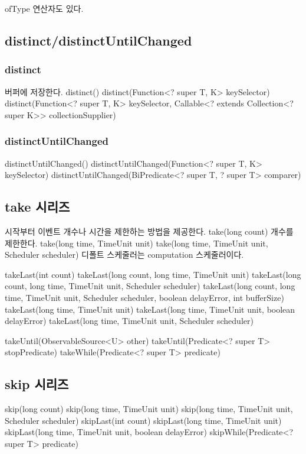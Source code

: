 \documentclass{book}
\begin{document}
{ofType 연산자도 있다.

\subsection{distinct/distinctUntilChanged}
\subsubsection{distinct}
버퍼에 저장한다.
distinct()
distinct(Function<? super T, K> keySelector)
distinct(Function<? super T, K> keySelector, Callable<? extends Collection<? super K>> collectionSupplier)

\subsubsection{distinctUntilChanged}
distinctUntilChanged()
distinctUntilChanged(Function<? super T, K> keySelector)
distinctUntilChanged(BiPredicate<? super T, ? super T> comparer)

\subsection{take 시리즈}

시작부터 이벤트 개수나 시간을 제한하는 방법을 제공한다.
take(long count)
개수를 제한한다.
take(long time, TimeUnit unit)
take(long time, TimeUnit unit, Scheduler scheduler)
디폴트 스케줄러는 computation 스케줄러이다.



takeLast(int count)
takeLast(long count, long time, TimeUnit unit)
takeLast(long count, long time, TimeUnit unit, Scheduler scheduler)
takeLast(long count, long time, TimeUnit unit, Scheduler scheduler, boolean delayError, int bufferSize)
takeLast(long time, TimeUnit unit)
takeLast(long time, TimeUnit unit, boolean delayError)
takeLast(long time, TimeUnit unit, Scheduler scheduler)

takeUntil(ObservableSource<U> other)
takeUntil(Predicate<? super T> stopPredicate)
takeWhile(Predicate<? super T> predicate)

\subsection{skip 시리즈}
skip(long count)
skip(long time, TimeUnit unit)
skip(long time, TimeUnit unit, Scheduler scheduler)
skipLast(int count)
skipLast(long time, TimeUnit unit)
skipLast(long time, TimeUnit unit, boolean delayError)
skipWhile(Predicate<? super T> predicate)

}
\end{document}

